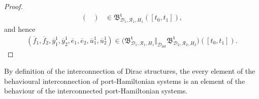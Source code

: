 \documentclass[preprint,12pt]{elsarticle}
\theoremstyle{definition}
\begin{document}
\begin{proof}
\begin{align*}
\begin{pmatrix}
\end{pmatrix} & \in \mathfrak{B}^{\mathfrak{t}}_{\mathcal{D}_1,\mathcal{R}_1,H_1}([t_0,t_1]),
\end{align*}
and hence
\begin{align*}
(\overline{f}_1,\overline{f}_2,\overline{y}_1^1,\overline{y}_2^1,\overline{e}_1,\overline{e}_2,\overline{u}_1^1,\overline{u}_2^1)\in \big(\mathfrak{B}^{\mathfrak{t}}_{\mathcal{D}_1,\mathcal{R}_1,H_1}\Vert_{\mathcal{D}_{\mathrm{int}}}\mathfrak{B}^{\mathfrak{t}}_{\mathcal{D}_2,\mathcal{R}_2,H_2}\big)([t_0,t_1]).
\end{align*}
\end{proof}

By definition of the interconnection of Dirac structures, the every element of the behavioural interconnection of port-Hamiltonian systems is an element of the behaviour of the interconnected port-Hamiltonian systems.                
\end{document}
